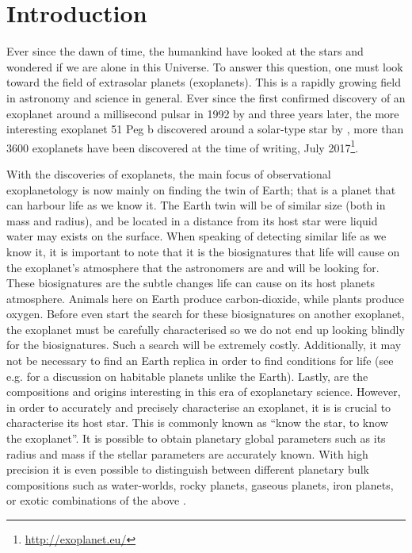 \chapter{Introduction}
\label{cha:introduction}

Ever since the dawn of time, the humankind have looked at the stars and wondered if we are alone in
this Universe. To answer this question, one must look toward the field of extrasolar planets
(exoplanets). This is a rapidly growing field in astronomy and science in general. Ever since the
first confirmed discovery of an exoplanet around a millisecond pulsar in 1992 by
\citet{Wolszczan1992} and three years later, the more interesting exoplanet 51 Peg b discovered
around a solar-type star by \citet{Mayor1995}, more than 3600 exoplanets have been discovered at the
time of writing, July 2017\footnote{\url{http://exoplanet.eu/}}.

With the discoveries of exoplanets, the main focus of observational exoplanetology is now mainly on
finding the twin of Earth; that is a planet that can harbour life as we know it. The Earth twin will
be of similar size (both in mass and radius), and be located in a distance from its host star were
liquid water may exists on the surface. When speaking of detecting similar life as we know it, it is
important to note that it is the biosignatures that life will cause on the exoplanet's atmosphere
that the astronomers are and will be looking for. These biosignatures are the subtle changes life
can cause on its host planets atmosphere. Animals here on Earth produce carbon-dioxide, while plants
produce oxygen. Before even start the search for these biosignatures on another exoplanet, the
exoplanet must be carefully characterised so we do not end up looking blindly for the biosignatures.
Such a search will be extremely costly. Additionally, it may not be necessary to find an Earth
replica in order to find conditions for life (see e.g. \citet{Alibert2014} for a discussion on
habitable planets unlike the Earth). Lastly, are the compositions and origins interesting in this
era of exoplanetary science. However, in order to accurately and precisely characterise an
exoplanet, it is is crucial to characterise its host star. This is commonly known as ``know the
star, to know the exoplanet''. It is possible to obtain planetary global parameters such as its
radius and mass if the stellar parameters are accurately known. With high precision it is even
possible to distinguish between different planetary bulk compositions such as water-worlds, rocky
planets, gaseous planets, iron planets, or exotic combinations of the above \citep[see
e.g.][]{Dorn2015,Thiabaud2014}.

